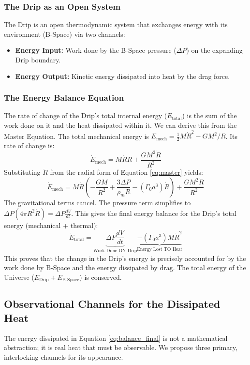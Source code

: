 \documentclass{BSpacePaper} %
\begin{document}
\begin{appendices}
\subsubsection{The Drip as an Open System}
The Drip is an open thermodynamic system that exchanges energy with its environment (B-Space) via two channels:
\begin{itemize}
    \item \textbf{Energy Input:} Work done by the B-Space pressure ($\Delta P$) on the expanding Drip boundary.
    \item \textbf{Energy Output:} Kinetic energy dissipated into heat by the drag force.
\end{itemize}

\subsubsection{The Energy Balance Equation}
The rate of change of the Drip's total internal energy ($E_{\text{total}}$) is the sum of the work done on it and the heat dissipated within it. We can derive this from the Master Equation. The total mechanical energy is $E_{\text{mech}} = \frac{1}{2}M\dot{R}^2 - GM^2/R$. Its rate of change is:
\begin{equation}
    \dot{E}_{\text{mech}} = M\dot{R}\ddot{R} + \frac{GM^2\dot{R}}{R^2}
\end{equation}
Substituting $\ddot{R}$ from the radial form of Equation \ref{eq:master} yields:
\begin{equation}
    \dot{E}_{\text{mech}} = M\dot{R}\left(-\frac{GM}{R^2} + \frac{3\Delta P}{\rho_m R} - (\Gamma_0 a^3)\dot{R}\right) + \frac{GM^2\dot{R}}{R^2}
\end{equation}
The gravitational terms cancel. The pressure term simplifies to $\Delta P (4\pi R^2 \dot{R}) = \Delta P \frac{dV}{dt}$. This gives the final energy balance for the Drip's total energy (mechanical + thermal):
\begin{equation}
    \dot{E}_{\text{total}} = \underbrace{\Delta P \frac{dV}{dt}}_{\text{Work Done ON Drip}} \underbrace{- (\Gamma_0 a^3) M \dot{R}^2}_{\text{Energy Lost TO Heat}}
    \label{eq:balance_final}
\end{equation}
This proves that the change in the Drip's energy is precisely accounted for by the work done by B-Space and the energy dissipated by drag. The total energy of the Universe ($E_{\text{Drip}} + E_{\text{B-Space}}$) is conserved.

\subsection{Observational Channels for the Dissipated Heat}
The energy dissipated in Equation \ref{eq:balance_final} is not a mathematical abstraction; it is real heat that must be observable. We propose three primary, interlocking channels for its appearance.


\end{appendices}
\end{document}
